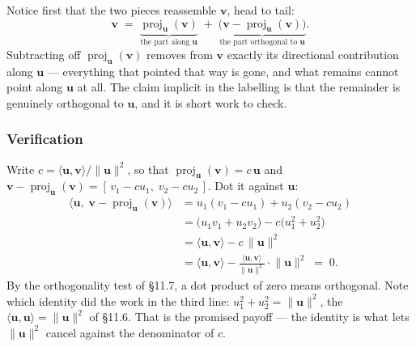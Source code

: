 \documentclass[11pt]{article}
\theoremstyle{definition}
\theoremstyle{remark}
\newcommand{\vc}[1]{\mathbf{#1}}
\newcommand{\norm}[1]{\lVert #1\rVert}
\newcommand{\proj}[2]{\operatorname{proj}_{#1}(#2)}
\newcommand{\lattice}[4]{%
  \draw[step=1cm,gray!25,very thin] (#1,#3) grid (#2,#4);
  \draw[axisline] (#1,0) -- (#2+0.45,0) node[right,font=\scriptsize,black]{$x$};
  \draw[axisline] (0,#3) -- (0,#4+0.45) node[above,font=\scriptsize,black]{$y$};
}
\begin{document}
\begin{center}
\end{center}

\noindent Notice first that the two pieces reassemble $\vc{v}$, head to tail:
\[
  \vc{v}
  \;=\;
  \underbrace{\proj{\vc{u}}{\vc{v}}}_{\textstyle\text{the part along }\vc{u}}
  \;+\;
  \underbrace{\bigl(\vc{v}-\proj{\vc{u}}{\vc{v}}\bigr)}_{\textstyle\text{the part orthogonal to }\vc{u}} .
\]
Subtracting off $\proj{\vc{u}}{\vc{v}}$ removes from $\vc{v}$ exactly its
directional contribution along $\vc{u}$ --- everything that pointed that way is
gone, and what remains cannot point along $\vc{u}$ at all. The claim implicit in
the labelling is that the remainder is genuinely orthogonal to $\vc{u}$, and it
is short work to check.

\subsubsection*{Verification}
Write $c=\langle\vc{u},\vc{v}\rangle/\norm{\vc{u}}^{2}$, so that
$\proj{\vc{u}}{\vc{v}}=c\,\vc{u}$ and
$\vc{v}-\proj{\vc{u}}{\vc{v}}=[\,v_1-cu_1,\;v_2-cu_2\,]$. Dot it against
$\vc{u}$:
\begin{align*}
  \bigl\langle \vc{u},\;\vc{v}-\proj{\vc{u}}{\vc{v}}\bigr\rangle
   &= u_1(v_1-cu_1)+u_2(v_2-cu_2) \\[2pt]
   &= \bigl(u_1v_1+u_2v_2\bigr)-c\bigl(u_1^{2}+u_2^{2}\bigr) \\[2pt]
   &= \langle\vc{u},\vc{v}\rangle - c\,\norm{\vc{u}}^{2} \\[2pt]
   &= \langle\vc{u},\vc{v}\rangle
      - \frac{\langle\vc{u},\vc{v}\rangle}{\norm{\vc{u}}^{2}}\cdot\norm{\vc{u}}^{2}
   \;=\; 0 .
\end{align*}
By the orthogonality test of \S11.7, a dot product of zero means orthogonal.
Note which identity did the work in the third line: $u_1^{2}+u_2^{2}=\norm{\vc{u}}^{2}$,
the $\langle\vc{u},\vc{u}\rangle=\norm{\vc{u}}^{2}$ of \S11.6. That is the
promised payoff --- the identity is what lets $\norm{\vc{u}}^{2}$ cancel against
the denominator of $c$.
\end{document}
